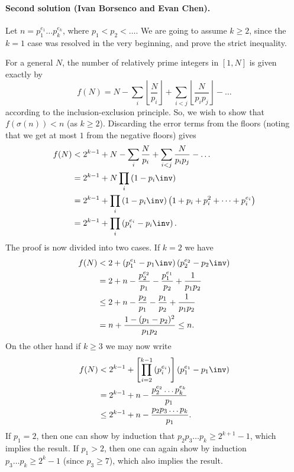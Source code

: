 \paragraph{Second solution (Ivan Borsenco and Evan Chen).}
Let $n = p_1^{e_1} \dots p_k^{e_k}$,
where $p_1 < p_2 < \dots$.
We are going to assume $k \ge 2$,
since the $k=1$ case was resolved in the very beginning,
and prove the strict inequality.

For a general $N$, the number of relatively prime integers in $[1,N]$ is
given exactly by
\[ f(N) = N - \sum_i \left\lfloor \frac{N}{p_i} \right\rfloor
  + \sum_{i<j} \left\lfloor \frac{N}{p_i p_j} \right\rfloor - \dots \]
according to the inclusion-exclusion principle.
So, we wish to show that $f(\sigma(n)) < n$ (as $k \ge 2$).
Discarding the error terms from the floors
(noting that we get at most $1$ from the negative floors)
gives
\begin{align*}
  f(N) &< 2^{k-1} + N - \sum_i \frac{N}{p_i}
    + \sum_{i<j} \frac{N}{p_i p_j} - \dots \\
  &= 2^{k-1} + N \prod_i \left( 1 - p_i\inv \right) \\
  &= 2^{k-1} + \prod_i \left( 1 - p_i\inv \right)
    \left( 1 + p_i + p_i^2 + \dots + p_i^{e_i} \right) \\
  &= 2^{k-1} + \prod_i \left( p_i^{e_i} - p_i\inv \right).
\end{align*}
The proof is now divided into two cases.
If $k=2$ we have
\begin{align*}
  f(N) &< 2 + \left( p_1^{e_1} - p_1\inv \right)\left( p_2^{e_2} -
  p_2\inv \right) \\
  &= 2 + n - \frac{p_2^{e_2}}{p_1} - \frac{p_1^{e_1}}{p_2}
    + \frac{1}{p_1p_2} \\
  &\le 2 + n - \frac{p_2}{p_1} - \frac{p_1}{p_2}
    + \frac{1}{p_1p_2} \\
  &= n + \frac{1-(p_1-p_2)^2}{p_1p_2} \le n.
\end{align*}
On the other hand if $k \ge 3$ we may now write
\begin{align*}
  f(N) &< 2^{k-1} + \left[ \prod_{i=2}^{k-1} \left( p_i^{e_i} \right)
    \right] \left( p_1^{e_1} - p_1\inv \right) \\
  &= 2^{k-1} + n - \frac{p_2^{e_2} \dots p_k^{e_k}}{p_1} \\
  &\le 2^{k-1} + n - \frac{p_2 p_3 \dots p_k}{p_1}.
\end{align*}
If $p_1 = 2$, then one can show
by induction that $p_2 p_3 \dots p_k \ge 2^{k+1}-1$,
which implies the result.
If $p_1 > 2$, then one can again show by induction
$p_3 \dots p_k \ge 2^k-1$ (since $p_3 \ge 7$),
which also implies the result.
